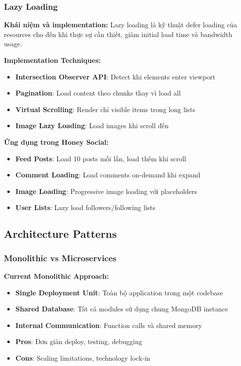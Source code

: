 \subsubsection{Lazy Loading}
\textbf{Khái niệm và implementation:}
Lazy loading là kỹ thuật defer loading của resources cho đến khi thực sự cần thiết, giảm initial load time và bandwidth usage.

\textbf{Implementation Techniques:}
\begin{itemize}
\item \textbf{Intersection Observer API}: Detect khi elements enter viewport
\item \textbf{Pagination}: Load content theo chunks thay vì load all
\item \textbf{Virtual Scrolling}: Render chỉ visible items trong long lists
\item \textbf{Image Lazy Loading}: Load images khi scroll đến
\end{itemize}

\textbf{Ứng dụng trong Honey Social:}
\begin{itemize}
\item \textbf{Feed Posts}: Load 10 posts mỗi lần, load thêm khi scroll
\item \textbf{Comment Loading}: Load comments on-demand khi expand
\item \textbf{Image Loading}: Progressive image loading với placeholders
\item \textbf{User Lists}: Lazy load followers/following lists
\end{itemize}

\subsection{Architecture Patterns}

\subsubsection{Monolithic vs Microservices}
\textbf{Current Monolithic Approach:}
\begin{itemize}
\item \textbf{Single Deployment Unit}: Toàn bộ application trong một codebase
\item \textbf{Shared Database}: Tất cả modules sử dụng chung MongoDB instance
\item \textbf{Internal Communication}: Function calls và shared memory
\item \textbf{Pros}: Đơn giản deploy, testing, debugging
\item \textbf{Cons}: Scaling limitations, technology lock-in
\end{itemize}

